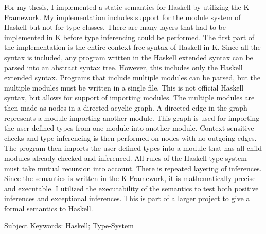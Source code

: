 For my thesis, I implemented a static semantics for Haskell by utilizing the K-Framework. My implementation includes support for the module system of Haskell but not for type classes. There are many layers that had to be implemented in K before type inferencing could be performed. The first part of the implementation is the entire context free syntax of Haskell in K. Since all the syntax is included, any program written in the Haskell extended syntax can be parsed into an abstract syntax tree. However, this includes only the Haskell extended syntax. Programs that include multiple modules can be parsed, but the multiple modules must be written in a single file. This is not official Haskell syntax, but allows for support of importing modules. The multiple modules are then made as nodes in a directed acyclic graph. A directed edge in the graph represents a module importing another module. This graph is used for importing the user defined types from one module into another module. Context sensitive checks and type inferencing is then performed on nodes with no outgoing edges. The program then imports the user defined types into a module that has all child modules already checked and inferenced. All rules of the Haskell type system must take mutual recursion into account. There is repeated layering of inferences. Since the semantics is written in the K-Framework, it is mathematically precise and executable. I utilized the executability of the semantics to test both positive inferences and exceptional inferences. This is part of a larger project to give a formal semantics to Haskell.

Subject Keywords: Haskell; Type-System
